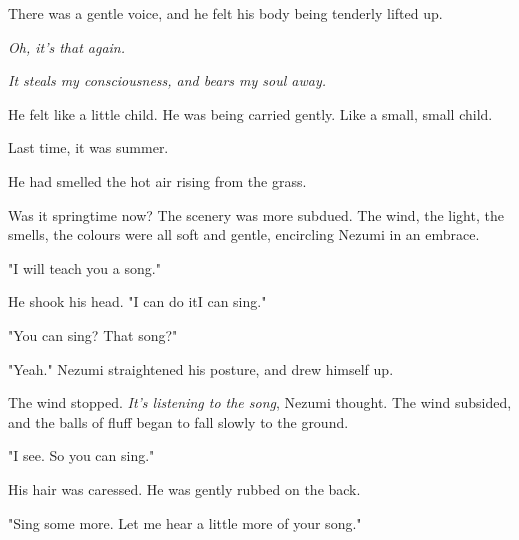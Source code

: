 There was a gentle voice, and he felt his body being tenderly lifted up.

\emph{Oh, it's that again.}

\emph{It steals my consciousness, and bears my soul away.}

He felt like a little child. He was being carried gently. Like a small,
small child.

Last time, it was summer.

He had smelled the hot air rising from the grass.

Was it springtime now? The scenery was more subdued. The wind, the
light, the smells, the colours were all soft and gentle, encircling
Nezumi in an embrace.

"I will teach you a song."

He shook his head. "I can do it\el I can sing."

"You can sing? That song?"

"Yeah." Nezumi straightened his posture, and drew himself up.


The wind stopped. \emph{It's listening to the song}, Nezumi thought. The wind
subsided, and the balls of fluff began to fall slowly to the ground.

"I see. So you can sing."

His hair was caressed. He was gently rubbed on the back.

"Sing some more. Let me hear a little more of your song."

\clearpage


